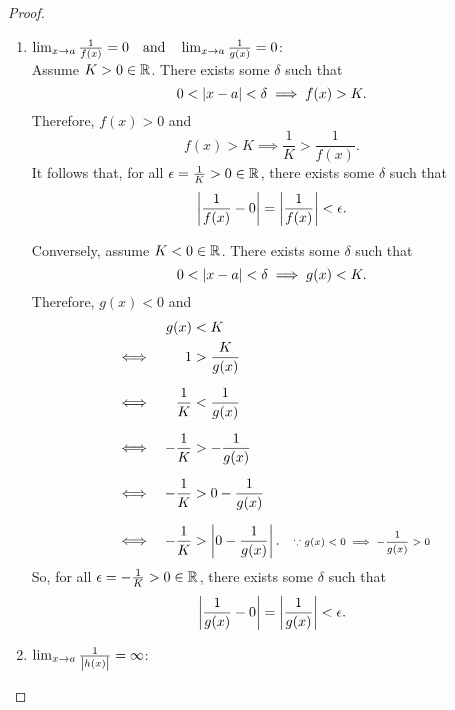 \documentclass[../MathsNotesBase.tex]{subfiles}
\begin{document}
{\begin{proof}
\begin{enumerate}[label=(\roman*)]
{					Clearly, since for any ordered field ${ \abs{a} \geq a }$, we have
					\[ f(x) > K \implies \abs{f(x)} > K \]
					so that
					\[ \lim_{x \to a} f(x) = \infty \implies \lim_{x \to a} \abs{f(x)} = \infty. \]
					In the case of $g$,
					\[\begin{aligned}
						\exists \gamma_1 > 0 \logicsep \abs{x - a} < \gamma_1 &\implies g(x) < M \\
						&\implies -g(x) > -M  &\sidecomment{} \\
						&\implies \abs{g(x)} > -M  &\sidecomment{${ \because \forall a \in \R{} \logicsep \abs{a} \geq a }$}
					\end{aligned}\]
					and also
					\[\begin{aligned}
						\exists \gamma_2 > 0 \logicsep \abs{x - a} < \gamma_2 &\implies g(x) < -M \\
						&\implies -g(x) > M  &\sidecomment{} \\
						&\implies \abs{g(x)} > M.  &\sidecomment{${ \because \forall a \in \R{} \logicsep \abs{a} \geq a }$}
					\end{aligned}\]
					Therefore, ${ \forall K \in \R{} }$
					\[ \exists \gamma \logicsep \abs{x - a} < \gamma \implies \abs{g(x)} > K. \]
				}
				\medskip
				\item{${\lim_{x \to a} \frac{1}{f(x)} = 0 \hspace{10pt}\text{and}\hspace{10pt} \lim_{x \to a} \frac{1}{g(x)} = 0 }$:\\
				
					Assume ${ K > 0 \in \mathbb{R}^{} }$. There exists some $\delta$ such that
					\[ 0 < \left\lvert x - a\right\rvert < \delta \implies f(x) > K. \]
					Therefore, ${ f(x) > 0 }$ and
					\[ f(x) > K \implies \frac{1}{K} > \frac{1}{f(x)}. \]
					It follows that, for all ${ \epsilon = \frac{1}{K} > 0 \in \mathbb{R}^{} }$, there exists some $\delta$ such that
					\[ \left\lvert\frac{1}{f(x)} - 0\right\rvert = \left\lvert\frac{1}{f(x)}\right\rvert < \epsilon. \]
					
					Conversely, assume ${ K < 0 \in \mathbb{R}^{} }$. There exists some $\delta$ such that
					\[ 0 < \left\lvert x - a\right\rvert < \delta \implies g(x) < K. \]
					Therefore, ${ g(x) < 0 }$ and
					\[\begin{aligned}
						&& g(x) &< K  \\
						&\iff & 1 &> \frac{K}{g(x)}  \nn
						&\iff & \frac{1}{K} &< \frac{1}{g(x)}  \nn
						&\iff & -\frac{1}{K} &> -\frac{1}{g(x)}  \nn
						&\iff & -\frac{1}{K} &> 0 - \frac{1}{g(x)}  \nn
						&\iff & -\frac{1}{K} &> \abs{0 - \frac{1}{g(x)}}.  &\sidecomment{${ \because g(x) < 0 \implies -\frac{1}{g(x)} > 0 }$}
					\end{aligned}\]
					So, for all ${ \epsilon = -\frac{1}{K} > 0 \in \mathbb{R}^{} }$, there exists some $\delta$ such that
					\[ \left\lvert\frac{1}{g(x)} - 0\right\rvert = \left\lvert\frac{1}{g(x)}\right\rvert < \epsilon. \]
				}
				\medskip
				\item{${\lim_{x \to a} \frac{1}{\left\lvert h(x)\right\rvert} = \infty }$:\\
					
}
\end{enumerate}
\end{proof}}
\end{document}
